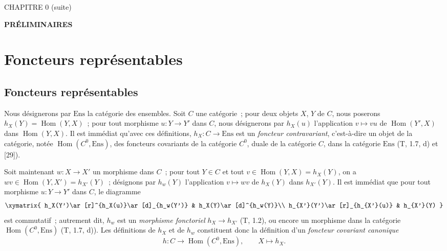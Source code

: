 \clearpage
\thispagestyle{plain}
\label{chapter:0III-fr}

\begin{center}
{\large CHAPITRE 0 (suite)\footnotemark\par}
\vspace{1.5em}
{\Large\bfseries PRÉLIMINAIRES\par}
\end{center}


\setcounter{section}{7}
\section{Foncteurs représentables}
\label{section:0.8-fr}

\setcounter{subsection}{0}
\subsection{Foncteurs représentables}
\label{subsection:0.8.1-fr}

\begin{env}[8.1.1]
\label{0.8.1.1-fr}
Nous désignerons par $\mathrm{Ens}$ la catégorie des ensembles. Soit $C$ une
catégorie~; pour deux objets $X$, $Y$ de $C$, nous poserons
$h_X(Y)=\operatorname{Hom}(Y,X)$~; pour tout morphisme $u:Y\to Y'$ dans $C$,
nous désignerons par $h_X(u)$ l'application $v\mapsto vu$ de
$\operatorname{Hom}(Y',X)$ dans $\operatorname{Hom}(Y,X)$. Il est immédiat
qu'avec ces définitions, $h_X:C\to\mathrm{Ens}$ est un \emph{foncteur
contravariant}, c'est-à-dire un objet de la catégorie, notée
$\operatorname{Hom}(C^0,\mathrm{Ens})$, des foncteurs covariants de la
catégorie $C^0$, duale de la catégorie $C$, dans la catégorie
$\mathrm{Ens}$ (T, 1.7, d) et [29]).
\end{env}

\begin{env}[8.1.2]
\label{0.8.1.2-fr}
Soit maintenant $w:X\to X'$ un morphisme dans $C$~; pour tout $Y\in C$ et
tout $v\in\operatorname{Hom}(Y,X)=h_X(Y)$, on a
$wv\in\operatorname{Hom}(Y,X')=h_{X'}(Y)$~; désignons par $h_w(Y)$
l'application $v\mapsto wv$ de $h_X(Y)$ dans $h_{X'}(Y)$. Il est immédiat
que pour tout morphisme $u:Y\to Y'$ dans $C$, le diagramme
\[
  \xymatrix{
    h_X(Y')\ar[r]^{h_X(u)}\ar[d]_{h_w(Y')} &
    h_X(Y)\ar[d]^{h_w(Y)}\\
    h_{X'}(Y')\ar[r]_{h_{X'}(u)} &
    h_{X'}(Y)
  }
\]
est commutatif~; autrement dit, $h_w$ est un \emph{morphisme fonctoriel}
$h_X\to h_{X'}$ (T, 1.2), ou encore un morphisme dans la catégorie
$\operatorname{Hom}(C^0,\mathrm{Ens})$ (T, 1.7, d)). Les définitions de
$h_X$ et de $h_w$ constituent donc la définition d'un \emph{foncteur
covariant canonique}
\[
  h:C\to\operatorname{Hom}(C^0,\mathrm{Ens}),\qquad X\mapsto h_X.
  \tag{8.1.2.1}
\]
\end{env}

